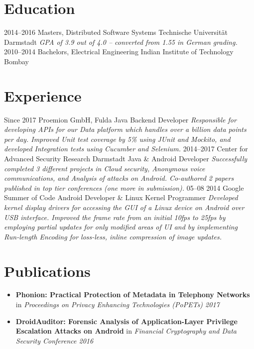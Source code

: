 \documentclass[]{friggeri-cv}
\begin{document}
\section{Education}
    \begin{entrylist}
        \entry
            {2014–2016}
            {Masters, {\normalfont Distributed Software Systems}}
            {Technische Universität Darmstadt}
            {\emph{GPA of 3.9 out of 4.0 -- converted from 1.55 in German grading.}}
        \entry
            {2010–2014}
            {Bachelors, {\normalfont Electrical Engineering}}
            {Indian Institute of Technology Bombay}
            {}%
    \end{entrylist}

\section{Experience}
    \begin{entrylist}
        \entry
            {Since 2017}
            {Proemion GmbH, Fulda}
            {Java Backend Developer}
            {\emph{Responsible for developing APIs for our Data platform which handles over a billion data points per day. Improved Unit test coverage by 5\% using JUnit and Mockito, and developed Integration tests using Cucumber and Selenium.}}
        \entry
            {2014–2017}
            {Center for Advanced Security Research Darmstadt}
            {Java \& Android Developer}
            {\emph{Successfully completed 3 different projects in Cloud security, Anonymous voice communications, and Analysis of attacks on Android. Co-authored 2 papers published in top tier conferences (one more in submission).}}
        \entry
            {05–08 2014}
            {Google Summer of Code}
            {Android Developer \& Linux Kernel Programmer}
            {\emph{Developed kernel display drivers for accessing the GUI of a Linux device on Android over USB interface. Improved the frame rate from an initial 10fps to 25fps by employing partial updates for only modified areas of UI and by implementing Run-length Encoding for loss-less, inline compression of image updates.}}
    \end{entrylist}

\section{Publications}
    \begin{itemize}
        \item \textbf{Phonion: Practical Protection of Metadata in Telephony Networks} in \textit{Proceedings on Privacy Enhancing Technologies (PoPETs) 2017}
        \item \textbf{DroidAuditor: Forensic Analysis of Application-Layer Privilege Escalation Attacks on Android} in \textit{Financial Cryptography and Data Security Conference 2016}
    \end{itemize}
\end{document}
